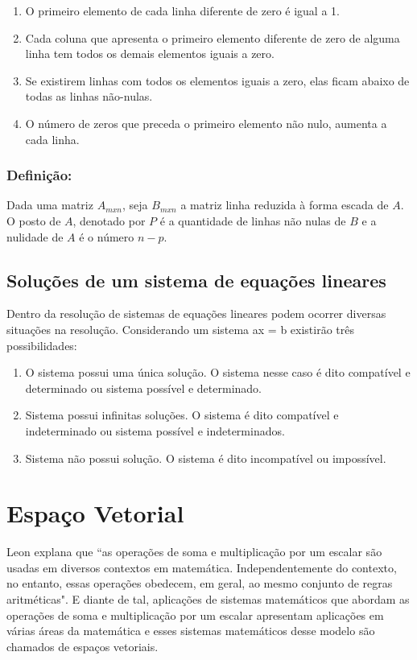 {{\begin{enumerate}
    \item O primeiro elemento de cada linha diferente de zero é igual a 1.
    \item Cada coluna que apresenta o primeiro elemento diferente de zero de alguma linha tem todos os demais elementos iguais a zero.
    \item Se existirem linhas com todos os elementos iguais a zero, elas ficam abaixo de todas as linhas não-nulas.
    \item O número de zeros que preceda o primeiro elemento não nulo, aumenta a cada linha.
\end{enumerate}

\subsubsection{Definição:}
\noindent Dada uma matriz $A_{mxn}$, seja $B_{mxn}$ a matriz linha reduzida à forma escada de $A$. O posto de $A$, denotado por $P$ é a quantidade de linhas não nulas de $B$ e a nulidade de $A$ é o número $n-p$.

\subsection{Soluções de um sistema de equações lineares}
\noindent Dentro da resolução de sistemas de equações lineares podem ocorrer diversas situações na resolução. Considerando um sistema ax = b existirão três possibilidades:
\begin{enumerate}
    \item O sistema possui uma única solução. O sistema nesse caso é dito compatível e determinado ou sistema possível e determinado.
    \item Sistema possui infinitas soluções. O sistema é dito compatível e indeterminado ou sistema possível e indeterminados.
    \item Sistema não possui solução. O sistema é dito incompatível ou impossível. 
\end{enumerate}

\section{Espaço Vetorial}
\noindent Leon \cite{1998:Leon} explana que ``as operações de soma e multiplicação por um escalar são usadas em diversos contextos em matemática. Independentemente do contexto, no entanto, essas operações obedecem, em geral, ao mesmo conjunto de regras aritméticas". E diante de tal, aplicações de sistemas matemáticos que abordam as operações de soma e multiplicação por um escalar apresentam aplicações em várias áreas da matemática e esses sistemas matemáticos desse modelo são chamados de espaços vetoriais. 

}}
